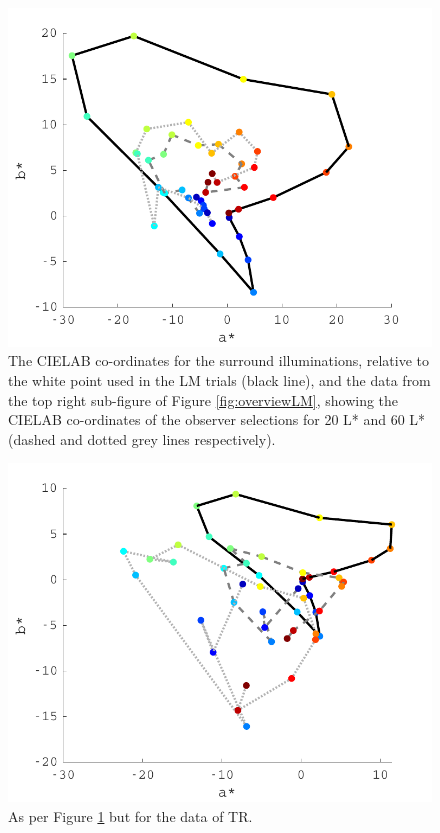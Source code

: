 \begin{figure}[htbp]
\includegraphics[max width=\textwidth]{figs/LargeSphere/LMcompareWithSurround.pdf}
\caption{The CIELAB co-ordinates for the surround illuminations, relative to the white point used in the LM trials (black line), and the data from the top right sub-figure of Figure \ref{fig:overviewLM}, showing the CIELAB co-ordinates of the observer selections for 20 L* and 60 L* (dashed and dotted grey lines respectively).}
\label{fig:LMCompSurr}
\end{figure}

\begin{figure}[htbp]
\includegraphics[max width=\textwidth]{figs/LargeSphere/TRcompareWithSurround.pdf}
\caption{As per Figure \ref{fig:LMCompSurr} but for the data of TR.}
\label{fig:TRCompSurr}
\end{figure}

